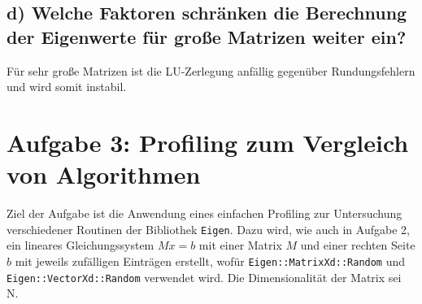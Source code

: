\subsection*{d) Welche Faktoren schränken die Berechnung der Eigenwerte für große Matrizen weiter ein?}
Für sehr große Matrizen ist die LU-Zerlegung anfällig gegenüber Rundungsfehlern und wird somit instabil.

\section*{Aufgabe 3: Profiling zum Vergleich von Algorithmen}
Ziel der Aufgabe ist die Anwendung eines einfachen Profiling zur Untersuchung verschiedener Routinen der
Bibliothek \texttt{Eigen}. Dazu wird, wie auch in Aufgabe 2, ein lineares Gleichungssystem $Mx = b$ mit einer Matrix
$M$ und einer rechten Seite $b$ mit jeweils zufälligen Einträgen erstellt, wofür \texttt{Eigen::MatrixXd::Random} und
\texttt{Eigen::VectorXd::Random} verwendet wird. Die Dimensionalität der Matrix sei N.
